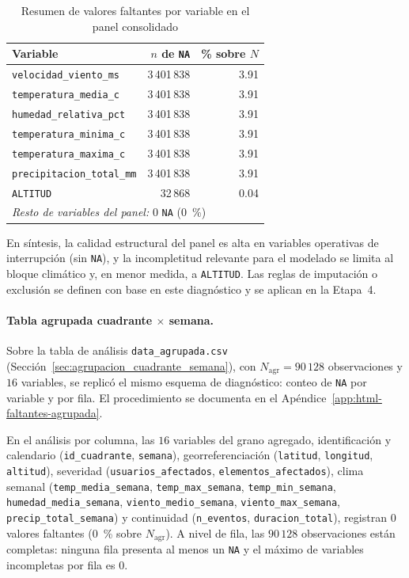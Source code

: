     \begin{table}[!htbp]
    \centering
\small
    \caption{Resumen de valores faltantes por variable en el panel consolidado}
    \label{tab:resumen_datos_faltantes}
    \begin{tabular}{l r r}
\toprule
    \textbf{Variable} & \textbf{$n$ de \texttt{NA}} & \textbf{\% sobre $N$} \\
\midrule
    \texttt{velocidad\_viento\_ms} & 3\,401\,838 & 3.91 \\
    \texttt{temperatura\_media\_c} & 3\,401\,838 & 3.91 \\
    \texttt{humedad\_relativa\_pct} & 3\,401\,838 & 3.91 \\
    \texttt{temperatura\_minima\_c} & 3\,401\,838 & 3.91 \\
    \texttt{temperatura\_maxima\_c} & 3\,401\,838 & 3.91 \\
    \texttt{precipitacion\_total\_mm} & 3\,401\,838 & 3.91 \\
    \texttt{ALTITUD} & 32\,868 & 0.04 \\
    \midrule
    \multicolumn{3}{l}{\textit{Resto de variables del panel:} $0$ \texttt{NA} ($0$~\%)} \\
    \bottomrule
    \end{tabular}
    \end{table}
    
    \noindent En síntesis, la calidad estructural del panel es alta en variables operativas de interrupción (sin \texttt{NA}), y la incompletitud relevante para el modelado se limita al bloque climático y, en menor medida, a \texttt{ALTITUD}. Las reglas de imputación o exclusión se definen con base en este diagnóstico y se aplican en la Etapa~4.
    
    \paragraph{Tabla agrupada cuadrante $\times$ semana.} Sobre la tabla de análisis \texttt{data\_agrupada.csv} (Sección~\ref{sec:agrupacion_cuadrante_semana}), con $N_{\mathrm{agr}} = 90\,128$ observaciones y $16$ variables, se replicó el mismo esquema de diagnóstico: conteo de \texttt{NA} por variable y por fila. El procedimiento se documenta en el Apéndice~\ref{app:html-faltantes-agrupada}.
    
    En el análisis por columna, las $16$ variables del grano agregado, identificación y calendario (\texttt{id\_cuadrante}, \texttt{semana}), georreferenciación (\texttt{latitud}, \texttt{longitud}, \texttt{altitud}), severidad (\texttt{usuarios\_afectados}, \texttt{elementos\_afectados}), clima semanal (\texttt{temp\_media\_semana}, \texttt{temp\_max\_semana}, \texttt{temp\_min\_semana}, \texttt{humedad\_media\_semana}, \texttt{viento\_medio\_semana}, \texttt{viento\_max\_semana}, \texttt{precip\_total\_semana}) y continuidad (\texttt{n\_eventos}, \texttt{duracion\_total}), registran $0$ valores faltantes ($0$~\% sobre $N_{\mathrm{agr}}$). A nivel de fila, las $90\,128$ observaciones están completas: ninguna fila presenta al menos un \texttt{NA} y el máximo de variables incompletas por fila es $0$.
    
